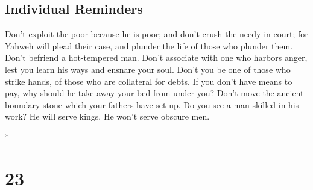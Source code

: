 \begin{paracol}{2}
\begin{otherlanguage}{english}
{\subsection{Individual Reminders}\label{individual-reminders}}

 Don't exploit the poor because he is poor; and don't
crush the needy in court;  for Yahweh will plead their
case, and plunder the life of those who plunder them. 
Don't befriend a hot-tempered man. Don't associate with one who harbors
anger,  lest you learn his ways and ensnare your soul.
 Don't you be one of those who strike hands, of those who
are collateral for debts.  If you don't have means to
pay, why should he take away your bed from under you? 
Don't move the ancient boundary stone which your fathers have set up.
 Do you see a man skilled in his work? He will serve
kings. He won't serve obscure men.

\end{otherlanguage}

\switchcolumn[0]*

\hypertarget{section-44}{%
\section{23}\label{section-44}}


\end{paracol}
